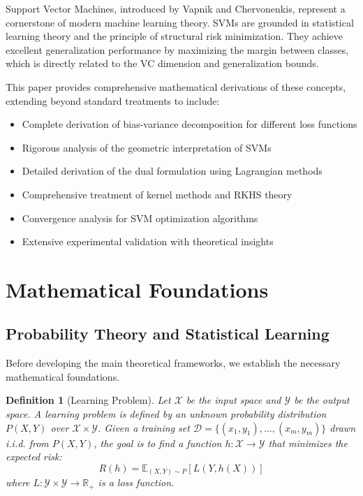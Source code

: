 \documentclass[12pt, a4paper]{article}
\newtheorem{definition}{Definition}
\begin{document}
Support Vector Machines, introduced by Vapnik and Chervonenkis, represent a cornerstone of modern machine learning theory. SVMs are grounded in statistical learning theory and the principle of structural risk minimization. They achieve excellent generalization performance by maximizing the margin between classes, which is directly related to the VC dimension and generalization bounds.

This paper provides comprehensive mathematical derivations of these concepts, extending beyond standard treatments to include:
\begin{itemize}
\item Complete derivation of bias-variance decomposition for different loss functions
\item Rigorous analysis of the geometric interpretation of SVMs
\item Detailed derivation of the dual formulation using Lagrangian methods
\item Comprehensive treatment of kernel methods and RKHS theory
\item Convergence analysis for SVM optimization algorithms
\item Extensive experimental validation with theoretical insights
\end{itemize}

\section{Mathematical Foundations}

\subsection{Probability Theory and Statistical Learning}

Before developing the main theoretical frameworks, we establish the necessary mathematical foundations.

\begin{definition}[Learning Problem]
Let $\mathcal{X}$ be the input space and $\mathcal{Y}$ be the output space. A learning problem is defined by an unknown probability distribution $P(X,Y)$ over $\mathcal{X} \times \mathcal{Y}$. Given a training set $\mathcal{D} = \{(x_1, y_1), \ldots, (x_m, y_m)\}$ drawn i.i.d. from $P(X,Y)$, the goal is to find a function $h: \mathcal{X} \to \mathcal{Y}$ that minimizes the expected risk:
\begin{equation}
R(h) = \mathbb{E}_{(X,Y) \sim P}[L(Y, h(X))]
\end{equation}
where $L: \mathcal{Y} \times \mathcal{Y} \to \mathbb{R}_+$ is a loss function.
\end{definition}
\end{document}
